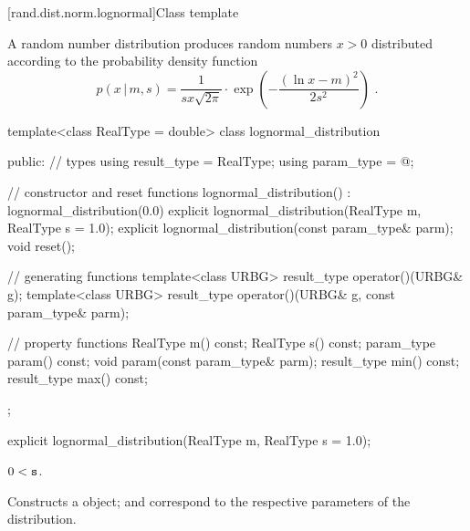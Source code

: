 
[rand.dist.norm.lognormal]{Class template }%
%
%

\pnum
A  random number distribution
produces random numbers $x > 0$
distributed according to
the probability density function%
%
%
\[ p(x\,|\,m,s) = \frac{1}{s x \sqrt{2 \pi}}
     \cdot \exp{\left(-\frac{(\ln{x} - m)^2}{2 s^2}\right)}
     \text{ .} \]

%
\begin{codeblock}
template<class RealType = double>
  class lognormal_distribution {
  public:
    // types
    using result_type = RealType;
    using param_type  = @\unspec@;

    // constructor and reset functions
    lognormal_distribution() : lognormal_distribution(0.0) {}
    explicit lognormal_distribution(RealType m, RealType s = 1.0);
    explicit lognormal_distribution(const param_type& parm);
    void reset();

    // generating functions
    template<class URBG>
      result_type operator()(URBG& g);
    template<class URBG>
      result_type operator()(URBG& g, const param_type& parm);

    // property functions
    RealType m() const;
    RealType s() const;
    param_type param() const;
    void param(const param_type& parm);
    result_type min() const;
    result_type max() const;
  };
\end{codeblock}


%
\begin{itemdecl}
explicit lognormal_distribution(RealType m, RealType s = 1.0);
\end{itemdecl}

\begin{itemdescr}
\pnum
\requires $0 < \texttt{s}$.

\pnum
\effects Constructs a  object;
 and 
correspond to the respective parameters of the distribution.
\end{itemdescr}

